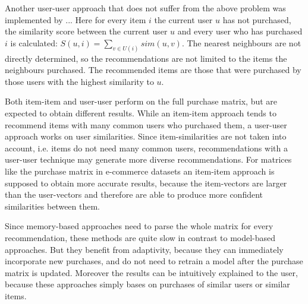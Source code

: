 \documentclass[10pt]{reportMaster}
\begin{document}
Another user-user approach that does not suffer from the above problem was implemented by ... %
Here for every item $i$ the current user $u$ has not purchased, the similarity score between the current user $u$ and every user who has purchased $i$ is calculated: $S(u,i) = \sum_{v \in U(i)}{sim(u,v)}$.
The nearest neighbours are not directly determined, so the recommendations are not limited to the items the neighbours purchased.
The recommended items are those that were purchased by those users with the highest similarity to $u$.

Both item-item and user-user perform on the full purchase matrix, but are expected to obtain different results.
While an item-item approach tends to recommend items with many common users who purchased them, a user-user approach works on user similarities.
Since item-similarities are not taken into account, i.e. items do not need many common users, recommendations with a user-user technique may generate more diverse recommendations.
For matrices like the purchase matrix in e-commerce datasets an item-item approach is supposed to obtain more accurate results, because the item-vectors are larger than the user-vectors and therefore are able to produce more confident similarities between them. 

Since memory-based approaches need to parse the whole matrix for every recommendation, these methods are quite slow in contrast to model-based approaches.
But they benefit from adaptivity, because they can immediately incorporate new purchases, and do not need to retrain a model after the purchase matrix is updated.
Moreover the results can be intuitively explained to the user, because these approaches simply bases on purchases of similar users or similar items.
\end{document}
